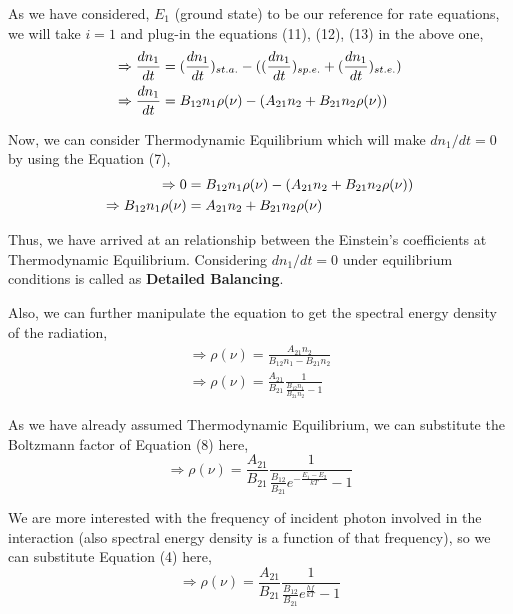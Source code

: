 \documentclass[12pt]{article}
\begin{document}
As we have considered, $E_{1}$ (ground state) to be our reference for rate equations, we will take $i = 1$ and plug-in the equations (11), (12), (13) in the above one,
\begin{align}
    \Rightarrow \frac{dn_{1}}{dt} & = (\frac{dn_{1}}{dt})_{st.a.} - ((\frac{dn_{1}}{dt})_{sp.e.} + (\frac{dn_{1}}{dt})_{st.e.}) \notag \\
    \Rightarrow \frac{dn_{1}}{dt} & = B_{12}n_{1}\rho(\nu) - (A_{21}n_{2} + B_{21}n_{2}\rho(\nu))
\end{align}

Now, we can consider Thermodynamic Equilibrium which will make $dn_{1}/dt = 0$ by using the Equation (7), 
\begin{align}
    \Rightarrow 0 & = B_{12}n_{1}\rho(\nu) - (A_{21}n_{2} + B_{21}n_{2}\rho(\nu)) \notag \\
    \Rightarrow B_{12}n_{1}\rho(\nu) & = A_{21}n_{2} + B_{21}n_{2}\rho(\nu)
\end{align}

Thus, we have arrived at an relationship between the Einstein's coefficients at Thermodynamic Equilibrium. Considering $dn_{1}/dt = 0$ under equilibrium conditions is called as \textbf{Detailed Balancing}. \vspace{.2cm}

Also, we can further manipulate the equation to get the spectral energy density of the radiation,
\begin{align*}
    \Rightarrow \rho(\nu) = \frac{A_{21}n_{2}}{B_{12}n_{1} - B_{21}n_{2}} \\
    \Rightarrow \rho(\nu) = \frac{A_{21}}{B_{21}} \frac{1}{\frac{B_{12}n_{1}}{B_{21}n_{2}} - 1}
\end{align*}

As we have already assumed Thermodynamic Equilibrium, we can substitute the Boltzmann factor of Equation (8) here,
\begin{equation*}
    \Rightarrow \rho(\nu) = \frac{A_{21}}{B_{21}} \frac{1}{\frac{B_{12}}{B_{21}} e^{-\frac{E_{1} - E_{2}}{kT}} - 1}
\end{equation*} \vspace{.2cm}

We are more interested with the frequency of incident photon involved in the interaction (also spectral energy density is a function of that frequency), so we can substitute Equation (4) here,
\begin{equation}
    \Rightarrow \rho(\nu) = \frac{A_{21}}{B_{21}} \frac{1}{\frac{B_{12}}{B_{21}} e^{\frac{hf}{kT}} - 1}
\end{equation}
\end{document}
